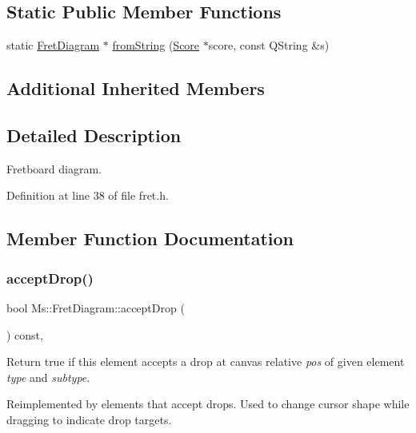 \subsection*{Static Public Member Functions}
\begin{DoxyCompactItemize}
\item 
static \hyperlink{class_ms_1_1_fret_diagram}{Fret\+Diagram} $\ast$ \hyperlink{class_ms_1_1_fret_diagram_a06ddcd684ffef74c489176980ba9b871}{from\+String} (\hyperlink{class_ms_1_1_score}{Score} $\ast$score, const Q\+String \&s)
\end{DoxyCompactItemize}
\subsection*{Additional Inherited Members}


\subsection{Detailed Description}
Fretboard diagram. 

Definition at line 38 of file fret.\+h.



\subsection{Member Function Documentation}
\mbox{\label{class_ms_1_1_fret_diagram_ab864841b949f7e5e5f16d93606b40896}} 
\subsubsection{\texorpdfstring{accept\+Drop()}{acceptDrop()}}
{\footnotesize\ttfamily bool Ms\+::\+Fret\+Diagram\+::accept\+Drop (\begin{DoxyParamCaption}\item[{\hyperlink{class_ms_1_1_edit_data}{Edit\+Data} \&}]{ }\end{DoxyParamCaption}) const\hspace{0.3cm}{\ttfamily [override]}, {\ttfamily [virtual]}}

Return true if this element accepts a drop at canvas relative {\itshape pos} of given element {\itshape type} and {\itshape subtype}.

Reimplemented by elements that accept drops. Used to change cursor shape while dragging to indicate drop targets. 

